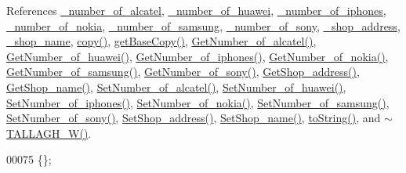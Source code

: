 References \hyperlink{_t_a_l_l_a_g_h___w_8h_source_l00117}{\+\_\+number\+\_\+of\+\_\+alcatel}, \hyperlink{_t_a_l_l_a_g_h___w_8h_source_l00115}{\+\_\+number\+\_\+of\+\_\+huawei}, \hyperlink{_t_a_l_l_a_g_h___w_8h_source_l00112}{\+\_\+number\+\_\+of\+\_\+iphones}, \hyperlink{_t_a_l_l_a_g_h___w_8h_source_l00116}{\+\_\+number\+\_\+of\+\_\+nokia}, \hyperlink{_t_a_l_l_a_g_h___w_8h_source_l00113}{\+\_\+number\+\_\+of\+\_\+samsung}, \hyperlink{_t_a_l_l_a_g_h___w_8h_source_l00114}{\+\_\+number\+\_\+of\+\_\+sony}, \hyperlink{_t_a_l_l_a_g_h___w_8h_source_l00110}{\+\_\+shop\+\_\+address}, \hyperlink{_t_a_l_l_a_g_h___w_8h_source_l00111}{\+\_\+shop\+\_\+name}, \hyperlink{_t_a_l_l_a_g_h___w_8cpp_source_l00035}{copy()}, \hyperlink{_t_a_l_l_a_g_h___w_8cpp_source_l00022}{get\+Base\+Copy()}, \hyperlink{_t_a_l_l_a_g_h___w_8cpp_source_l00071}{Get\+Number\+\_\+of\+\_\+alcatel()}, \hyperlink{_t_a_l_l_a_g_h___w_8cpp_source_l00087}{Get\+Number\+\_\+of\+\_\+huawei()}, \hyperlink{_t_a_l_l_a_g_h___w_8cpp_source_l00111}{Get\+Number\+\_\+of\+\_\+iphones()}, \hyperlink{_t_a_l_l_a_g_h___w_8cpp_source_l00079}{Get\+Number\+\_\+of\+\_\+nokia()}, \hyperlink{_t_a_l_l_a_g_h___w_8cpp_source_l00103}{Get\+Number\+\_\+of\+\_\+samsung()}, \hyperlink{_t_a_l_l_a_g_h___w_8cpp_source_l00095}{Get\+Number\+\_\+of\+\_\+sony()}, \hyperlink{_t_a_l_l_a_g_h___w_8cpp_source_l00127}{Get\+Shop\+\_\+address()}, \hyperlink{_t_a_l_l_a_g_h___w_8cpp_source_l00119}{Get\+Shop\+\_\+name()}, \hyperlink{_t_a_l_l_a_g_h___w_8cpp_source_l00067}{Set\+Number\+\_\+of\+\_\+alcatel()}, \hyperlink{_t_a_l_l_a_g_h___w_8cpp_source_l00083}{Set\+Number\+\_\+of\+\_\+huawei()}, \hyperlink{_t_a_l_l_a_g_h___w_8cpp_source_l00107}{Set\+Number\+\_\+of\+\_\+iphones()}, \hyperlink{_t_a_l_l_a_g_h___w_8cpp_source_l00075}{Set\+Number\+\_\+of\+\_\+nokia()}, \hyperlink{_t_a_l_l_a_g_h___w_8cpp_source_l00099}{Set\+Number\+\_\+of\+\_\+samsung()}, \hyperlink{_t_a_l_l_a_g_h___w_8cpp_source_l00091}{Set\+Number\+\_\+of\+\_\+sony()}, \hyperlink{_t_a_l_l_a_g_h___w_8cpp_source_l00123}{Set\+Shop\+\_\+address()}, \hyperlink{_t_a_l_l_a_g_h___w_8cpp_source_l00115}{Set\+Shop\+\_\+name()}, \hyperlink{_t_a_l_l_a_g_h___w_8cpp_source_l00062}{to\+String()}, and \hyperlink{_t_a_l_l_a_g_h___w_8cpp_source_l00012}{$\sim$\+T\+A\+L\+L\+A\+G\+H\+\_\+\+W()}.


\begin{DoxyCode}
00075 \{\};
\end{DoxyCode}


